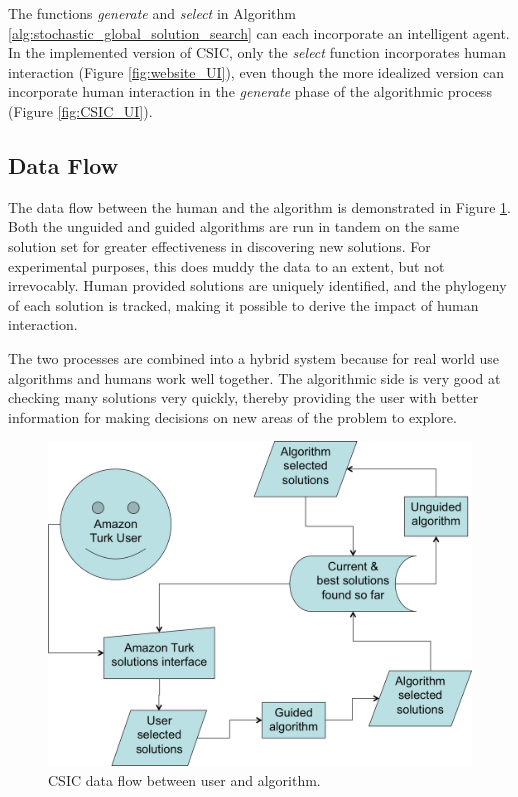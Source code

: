 The functions \emph{generate} and \emph{select} in Algorithm \ref{alg:stochastic_global_solution_search} can each incorporate an intelligent agent.  In the implemented version of CSIC, only the \emph{select} function incorporates human interaction (Figure \ref{fig:website_UI}), even though the more idealized version can incorporate human interaction in the \emph{generate} phase of the algorithmic process (Figure \ref{fig:CSIC_UI}).  

\subsection{Data Flow}
The data flow between the human and the algorithm is demonstrated in Figure \ref{fig:data_flow}.  Both the unguided and guided algorithms are run in tandem on the same solution set for greater effectiveness in discovering new solutions.  For experimental purposes, this does muddy the data to an extent, but not irrevocably.  Human provided solutions are uniquely identified, and the phylogeny of each solution is tracked, making it possible to derive the impact of human interaction.  

The two processes are combined into a hybrid system because for real world use algorithms and humans work well together.  The algorithmic side is very good at checking many solutions very quickly, thereby providing the user with better information for making decisions on new areas of the problem to explore.

\begin{figure}[!t]
  \centering
  \includegraphics[width=4.5in]{HollowayDataFlow}
  \caption{CSIC data flow between user and algorithm.}
  \label{fig:data_flow}
\end{figure}


